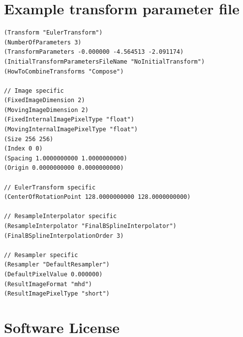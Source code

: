 \documentclass[]{report}
\begin{document}

\chapter{Example transform parameter file}\label{chp:ExampleTransformParam}

\small
\begin{verbatim}
(Transform "EulerTransform")
(NumberOfParameters 3)
(TransformParameters -0.000000 -4.564513 -2.091174)
(InitialTransformParametersFileName "NoInitialTransform")
(HowToCombineTransforms "Compose")

// Image specific
(FixedImageDimension 2)
(MovingImageDimension 2)
(FixedInternalImagePixelType "float")
(MovingInternalImagePixelType "float")
(Size 256 256)
(Index 0 0)
(Spacing 1.0000000000 1.0000000000)
(Origin 0.0000000000 0.0000000000)

// EulerTransform specific
(CenterOfRotationPoint 128.0000000000 128.0000000000)

// ResampleInterpolator specific
(ResampleInterpolator "FinalBSplineInterpolator")
(FinalBSplineInterpolationOrder 3)

// Resampler specific
(Resampler "DefaultResampler")
(DefaultPixelValue 0.000000)
(ResultImageFormat "mhd")
(ResultImagePixelType "short")
\end{verbatim}
\normalsize


\chapter{Software License} \label{chp:License}
\end{document}
